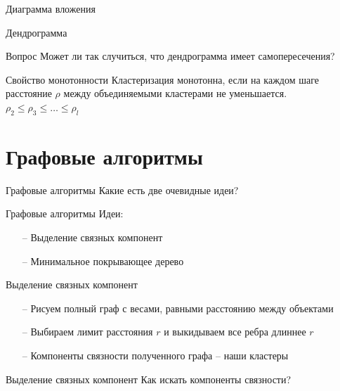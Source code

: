 \documentclass[10pt]{beamer}
\begin{document}
\begin{frame}{Диаграмма вложения}
\end{frame}

\begin{frame}{Дендрограмма}
\end{frame}


\begin{frame}{Вопрос}
  \centering  
  Может ли так случиться, что дендрограмма имеет самопересечения?
\end{frame}

\begin{frame}{Свойство монотонности}
  Кластеризация монотонна, если на каждом шаге расстояние $\rho$ между объединяемыми кластерами не уменьшается.\\
  $\rho_2 \leq \rho_3 \leq \dots \leq \rho_l$
\end{frame}

\section{Графовые алгоритмы}

\begin{frame}{Графовые алгоритмы}
  \centering  
  Какие есть две очевидные идеи?
\end{frame}

\begin{frame}{Графовые алгоритмы}
	Идеи:\\
	\begin{itemize}
		\item[--] Выделение связных компонент
		\item[--] Минимальное покрывающее дерево
	\end{itemize}
\end{frame}

\begin{frame}{Выделение связных компонент}
	\begin{itemize}
		\item[--] Рисуем полный граф с весами, равными расстоянию между объектами
		\item[--] Выбираем лимит расстояния $r$ и выкидываем все ребра длиннее $r$
		\item[--] Компоненты связности полученного графа -- наши кластеры
	\end{itemize}
\end{frame}

\begin{frame}{Выделение связных компонент}
  \centering
  Как искать компоненты связности?
\end{frame}
\end{document}
